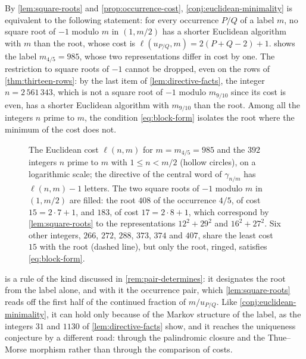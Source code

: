 By \cref{lem:square-roots} and \cref{prop:occurrence-cost},
\cref{conj:euclidean-minimality} is equivalent to the following statement:
for every occurrence $P/Q$ of a label $m$, no square root of $-1$ modulo $m$
in $(1,m/2)$ has a shorter Euclidean algorithm with $m$ than the root, whose
cost is $\ell(u_{P/Q},m)=2(P+Q-2)+1$.  shows the label
$m_{4/5}=985$, whose two representations differ in cost by one. The
restriction to square roots of $-1$ cannot be dropped, even on the rows of
\cref{thm:thirteen-rows}: by the last item of \cref{lem:directive-facts}, the
integer $n=2\,561\,343$, which is not a square root of $-1$ modulo $m_{9/10}$
since its cost is even, has a shorter Euclidean algorithm with $m_{9/10}$
than the root. Among all the integers $n$ prime to $m$, the condition
\eqref{eq:block-form} isolates the root where the minimum of the cost does
not.

\begin{figure}[tb]
\centering

\caption{The Euclidean cost $\ell(n,m)$ for $m=m_{4/5}=985$ and the $392$
integers $n$ prime to $m$ with $1\leqslant n<m/2$ (hollow circles), on a
logarithmic scale; the directive of the central word of $\gamma_{n/m}$ has
$\ell(n,m)-1$ letters. The two square roots of $-1$ modulo $m$ in $(1,m/2)$ are
filled: the root $408$ of the occurrence $4/5$, of cost $15=2\cdot7+1$, and
$183$, of cost $17=2\cdot8+1$, which correspond by \cref{lem:square-roots} to the
representations $12^2+29^2$ and $16^2+27^2$. Six other integers, $266$,
$272$, $288$, $373$, $374$ and $407$, share the least cost $15$ with the root
(dashed line), but only the root, ringed, satisfies \eqref{eq:block-form}.}
\label{fig:directives}
\end{figure}

 is a rule of the kind discussed in
\cref{rem:pair-determines}: it designates the root from the label alone, and
with it the occurrence pair, which \cref{lem:square-roots} reads off the
first half of the continued fraction of $m/u_{P/Q}$. Like
\cref{conj:euclidean-minimality}, it can hold only because of the Markov
structure of the label, as the integers $31$ and $1130$ of
\cref{lem:directive-facts} show, and it
reaches the uniqueness conjecture by a different road: through the
palindromic closure and the Thue--Morse morphism rather than through the
comparison of costs.
